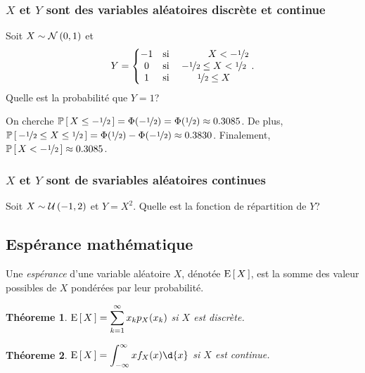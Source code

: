 \documentclass[11pt]{article}
\renewcommand\P[1]{%
	\ensuremath{%
		\mathbb{P}\left[\,#1\,\right]%
	}%
}%
\newcommand\Uni[2]{%
	\ensuremath{%
		\mathcal{U}\left(#1,#2\right)%
	}%
}%
\newcommand\Norm[2]{%
	\ensuremath{%
		\mathcal{N}\left(#1,#2\right)%
	}%
}%
\newcommand\Esp[1]{%
	\ensuremath{%
		\mathrm{E}\left[\,#1\,\right]%
	}%
}%
\newtheorem{theoreme}{Théoreme}[section]
\begin{document}
\subsubsection{$X$ et $Y$ sont des variables aléatoires discrète et continue}
\begin{exemple}
	Soit $X\sim\Norm{0}{1}$ et
	\begin{equation*}
		Y=\left\{
			\begin{matrix}
				-1&\text{si}&\phantom{-\nicefrac{1}{2}\leq}X<-\nicefrac{1}{2}\\
				 0&\text{si}&-\nicefrac{1}{2}\leq X<\nicefrac{1}{2}\\
				 1&\text{si}&\nicefrac{1}{2}\leq X\\
			\end{matrix}
		\right..
	\end{equation*}
	Quelle est la probabilité que $Y=1$?

	On cherche $\P{X\leq-\nicefrac{1}{2}}=\Phi(-\nicefrac{1}{2})=
	\Phi(\nicefrac{1}{2})\approx\SI{0.3085}{}$. De plus, $\P{-\nicefrac{1}{2}
	\leq X\leq\nicefrac{1}{2}}=\Phi(\nicefrac{1}{2})-\Phi(-\nicefrac{1}{2})
	\approx\SI{0.3830}{}$. Finalement, $\P{X<-\nicefrac{1}{2}}\approx
	\SI{0.3085}{}$.
\end{exemple}

\subsubsection{$X$ et $Y$ sont de svariables aléatoires continues}
\begin{exemple}
	Soit $X\sim\Uni{-1}{2}$ et $Y=X^2$. Quelle est la fonction de répartition de
	$Y$?
\end{exemple}

\subsection{Espérance mathématique}
\begin{definition}
	Une \textit{espérance} d'une variable aléatoire $X$, dénotée $\Esp{X}$, est
	la somme des valeur possibles de $X$ pondérées par leur probabilité.
\end{definition}

\begin{theoreme}
	$\Esp{X}=\displaystyle\sum_{k=1}^\infty x_kp_X(x_k)$ si $X$ est discrète.
\end{theoreme}

\begin{theoreme}
	$\Esp{X}=\displaystyle\int_{-\infty}^\infty xf_X(x)\d{x}$ si $X$ est
	continue.
\end{theoreme}
\end{document}
